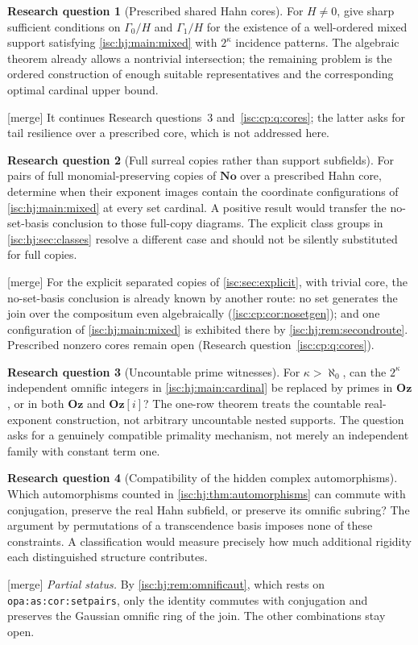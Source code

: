 \documentclass[11pt,letterpaper]{article}
\theoremstyle{definition}
\newtheorem{question}{Research question}
\theoremstyle{remark}
\newcommand{\No}{\mathbf{No}}
\newcommand{\Oz}{\mathbf{Oz}}
\newcommand{\lbl}[1]{\nolinkurl{#1}}%
\newcommand{\mtag}{\textup{[merge]}}%
\numberwithin{equation}{section}
\begin{document}
\begin{question}[Prescribed shared Hahn cores]\label{isc:hj:q:cores}
For $H\ne0$, give sharp sufficient conditions on
$\Gamma_0/H$ and $\Gamma_1/H$ for the existence of a well-ordered mixed
support satisfying \cref{isc:hj:main:mixed} with $2^\kappa$ incidence patterns.
The algebraic theorem already allows a nontrivial intersection; the
remaining problem is the ordered construction of enough suitable
representatives and the corresponding optimal cardinal upper bound.
\end{question}
\mtag{} It continues Research questions~3 and~\ref{isc:cp:q:cores}; the
latter asks for tail resilience over a prescribed core, which is not
addressed here.

\begin{question}[Full surreal copies rather than support subfields]\label{isc:hj:q:copies}
For pairs of full monomial-preserving copies of $\No$ over a prescribed
Hahn core, determine when their exponent images contain the coordinate
configurations of \cref{isc:hj:main:mixed} at every set cardinal.
A positive result would transfer the no-set-basis conclusion to those
full-copy diagrams. The explicit class groups in \cref{isc:hj:sec:classes}
resolve a different case and should not be silently substituted for
full copies.
\end{question}
\mtag{} For the explicit separated copies of \cref{isc:sec:explicit}, with
trivial core, the no-set-basis conclusion is already known by another
route: no set generates the join over the compositum even algebraically
(\cref{isc:cp:cor:nosetgen}); and one configuration of
\cref{isc:hj:main:mixed} is exhibited there by \cref{isc:hj:rem:secondroute}.
Prescribed nonzero cores remain open (Research question~\ref{isc:cp:q:cores}).

\begin{question}[Uncountable prime witnesses]\label{isc:hj:q:primes}
For $\kappa>\aleph_0$, can the $2^\kappa$ independent omnific integers
in \cref{isc:hj:main:cardinal} be replaced by primes in $\Oz$, or in both
$\Oz$ and $\Oz[i]$? The one-row theorem treats the countable
real-exponent construction, not arbitrary uncountable nested supports.
The question asks for a genuinely compatible primality mechanism, not
merely an independent family with constant term one.
\end{question}

\begin{question}[Compatibility of the hidden complex automorphisms]\label{isc:hj:q:automorphisms}
Which automorphisms counted in \cref{isc:hj:thm:automorphisms} can commute
with conjugation, preserve the real Hahn subfield, or preserve its omnific
subring? The argument by permutations of a transcendence basis imposes
none of these constraints. A classification would measure precisely how
much additional rigidity each distinguished structure contributes.
\end{question}
\mtag{} \emph{Partial status.} By \cref{isc:hj:rem:omnificaut}, which rests
on \lbl{opa:as:cor:setpairs}, only the identity commutes with conjugation
and preserves the Gaussian omnific ring of the join. The other combinations
stay open.
\end{document}
